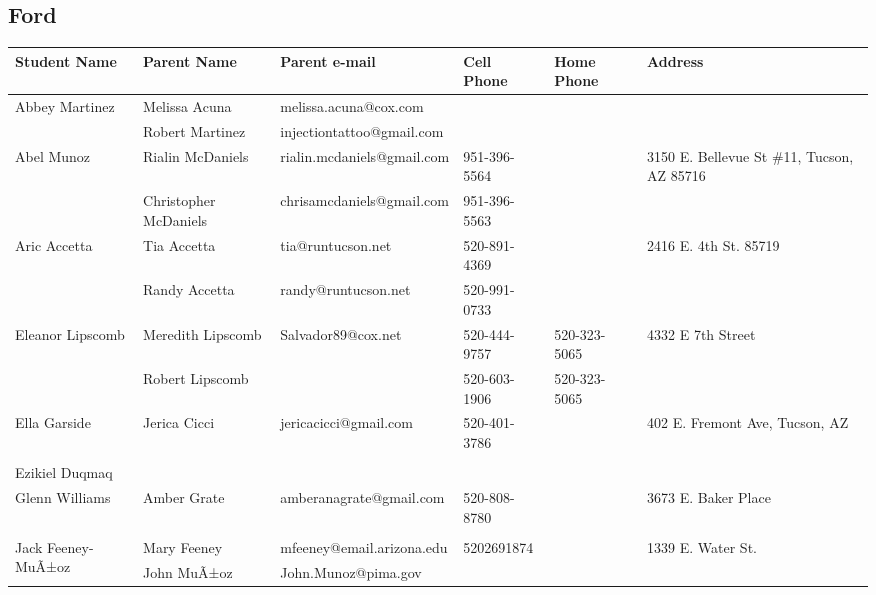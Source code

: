 \documentclass[landscape]{article}\usepackage[]{graphicx}\usepackage[]{color}
\begin{document}
\subsection{Ford}
\begin{longtable}{|p{100pt}|p{100pt}|p{140pt}|p{60pt}|p{64pt}|p{120pt}|}
\textbf{Student Name} & \textbf{Parent Name} & \textbf{Parent e-mail} & \textbf{Cell Phone} & \textbf{Home Phone} & \textbf{Address}\\
\hline
\hline
\multirow{2}{100pt}{Abbey Martinez} & Melissa Acuna & melissa.acuna@cox.com &  &  & \multirow{2}{120pt}{} \\
 & Robert Martinez & injectiontattoo@gmail.com &  &  & \\
\hline
\multirow{2}{100pt}{Abel Munoz} & Rialin McDaniels & rialin.mcdaniels@gmail.com & 951-396-5564 &  & \multirow{2}{120pt}{3150 E. Bellevue St \#11, Tucson, AZ 85716} \\
 & Christopher McDaniels & chrisamcdaniels@gmail.com & 951-396-5563 &  & \\
\hline
\multirow{2}{100pt}{Aric Accetta} & Tia Accetta & tia@runtucson.net & 520-891-4369 &  & \multirow{2}{120pt}{2416 E. 4th St. 85719} \\
 & Randy Accetta & randy@runtucson.net & 520-991-0733 &  & \\
\hline
\multirow{2}{100pt}{Eleanor Lipscomb} & Meredith Lipscomb & Salvador89@cox.net & 520-444-9757 & 520-323-5065 & \multirow{2}{120pt}{4332 E 7th Street} \\
 & Robert Lipscomb &  & 520-603-1906 & 520-323-5065 & \\
\hline
\multirow{2}{100pt}{Ella Garside} & Jerica Cicci & jericacicci@gmail.com & 520-401-3786 &  & \multirow{2}{120pt}{402 E. Fremont Ave, Tucson, AZ } \\
 &  &  &  &  & \\
\hline
\multirow{2}{100pt}{Ezikiel Duqmaq} &  &  &  &  & \multirow{2}{120pt}{} \\
 &  &  &  &  & \\
\hline
\multirow{2}{100pt}{Glenn Williams} & Amber Grate & amberanagrate@gmail.com & 520-808-8780 &  & \multirow{2}{120pt}{3673 E. Baker Place} \\
 &  &  &  &  & \\
\hline
\multirow{2}{100pt}{Jack Feeney-MuÃ±oz} & Mary Feeney & mfeeney@email.arizona.edu & 5202691874 &  & \multirow{2}{120pt}{1339 E. Water St.} \\
 & John MuÃ±oz & John.Munoz@pima.gov &  &  & \\
\hline

\end{longtable}
\end{document}
